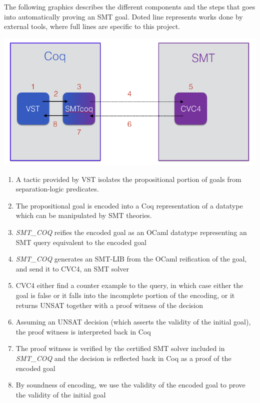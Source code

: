 \documentclass[onecolumn, preprint]{sigplanconf}
\begin{document}
The following graphics describes the different components and the steps that goes into automatically proving an SMT goal. Doted line represents works done by external tools, where full lines are specific to this project.

\begin{center}
\includegraphics[scale=0.5]{pictures/arch.png}
\end{center}


\begin{enumerate}
\item %
  A tactic provided by VST isolates the propositional portion of goals from separation-logic predicates.
\item %
  The propositional goal is encoded into a Coq representation of a datatype which can be manipulated by SMT theories.
  
\item %
 \emph{SMT\_COQ} reifies the encoded goal as an OCaml datatype representing an SMT query equivalent to the encoded goal
  
\item %
  \emph{SMT\_COQ} generates an SMT-LIB from the OCaml reification of the goal, and send it to CVC4, an SMT solver
  
\item %
  CVC4 either find a counter example to the query, in which case either the goal is false or it falls into the incomplete portion of the encoding, or it returns UNSAT together with a proof witness of the decision
  
\item %
  Assuming an UNSAT decision (which asserts the validity of the initial goal), the proof witness is interpreted back in Coq 
  
  
\item %
  The proof witness is verified by the certified SMT solver included in \emph{SMT\_COQ} and the decision is reflected back in Coq as a proof of the encoded goal
  
\item %
  By soundness of encoding, we use the validity of the encoded goal to prove the validity of the initial goal

  
\end{enumerate}
\end{document}
